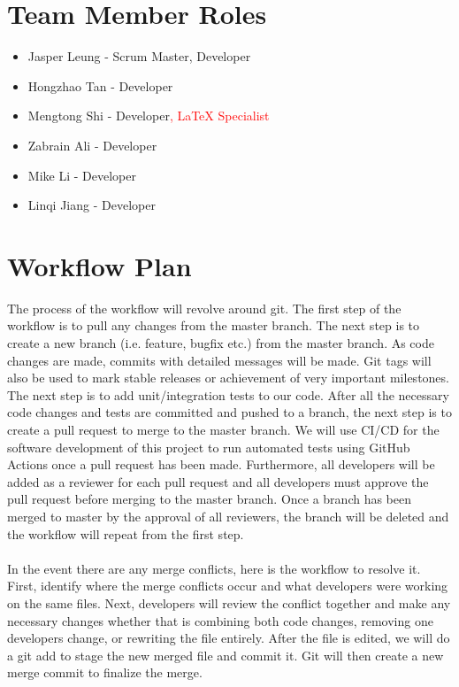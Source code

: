 \documentclass{article}
\begin{document}
\section{Team Member Roles}
\begin{itemize}
    \item Jasper Leung - Scrum Master, Developer
    \item Hongzhao Tan - Developer
    \item Mengtong Shi - Developer\textcolor{red}{, LaTeX Specialist}
    \item Zabrain Ali - Developer
    \item Mike Li - Developer
    \item Linqi Jiang - Developer
\end{itemize}

\section{Workflow Plan}
	
	The process of the workflow will revolve around git. The first step of the workflow is to pull any changes from the master branch. The next step is to create a new branch (i.e. feature, bugfix etc.) from the master branch. As code changes are made, commits with detailed messages will be made. Git tags will also be used to mark stable releases or achievement of very important milestones. The next step is to add unit/integration tests to our code. After all the necessary code changes and tests are committed and pushed to a branch, the next step is to create a pull request to merge to the master branch. We will use CI/CD for the software development of this project to run automated tests using GitHub Actions once a pull request has been made. Furthermore, all developers will be added as a reviewer for each pull request and all developers must approve the pull request before merging to the master branch. Once a branch has been merged to master by the approval of all reviewers, the branch will be deleted and the workflow will repeat from the first step. 
	\\
	\\
	In the event there are any merge conflicts, here is the workflow to resolve it. First, identify where the merge conflicts occur and what developers were working on the same files. Next, developers will review the conflict together and make any necessary changes whether that is combining both code changes, removing one developers change, or rewriting the file entirely. After the file is edited, we will do a git add to stage the new merged file and commit it. Git will then create a new merge commit to finalize the merge.
\end{document}
